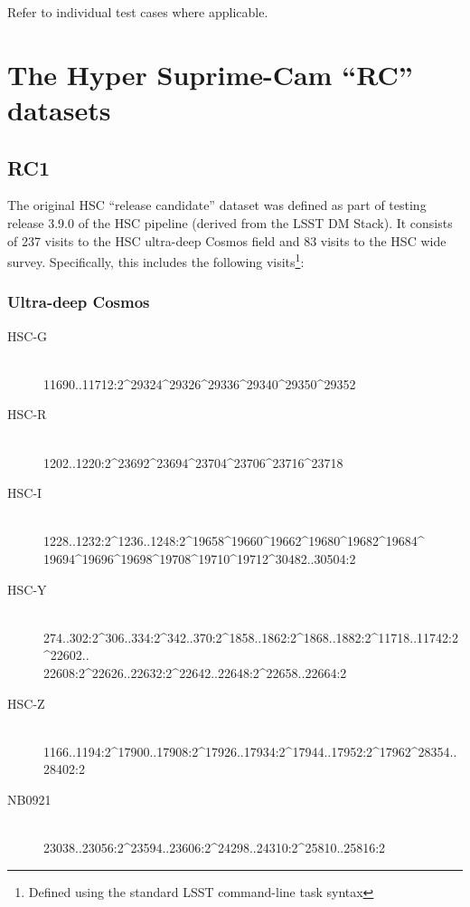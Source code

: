 \documentclass[DM,lsstdraft,STS,toc]{lsstdoc}
\begin{document}
Refer to individual test cases where applicable.





\appendix

\section{The Hyper Suprime-Cam ``RC'' datasets}

\subsection{RC1}

The original HSC ``release candidate'' dataset was defined as part of testing
release 3.9.0 of the HSC pipeline (derived from the LSST DM Stack). It
consists of 237 visits to the HSC ultra-deep Cosmos field and 83 visits to the
HSC wide survey. Specifically, this includes the following
visits\footnote{Defined using the standard LSST command-line task syntax}:

\subsubsection{Ultra-deep Cosmos}
\label{sec:hscrc1}

\begin{description}

\item[HSC-G]{\hfill \\ 11690..11712:2\^{}29324\^{}29326\^{}29336\^{}29340\^{}29350\^{}29352}
\item[HSC-R]{\hfill \\ 1202..1220:2\^{}23692\^{}23694\^{}23704\^{}23706\^{}23716\^{}23718}
\item[HSC-I]{\hfill \\ 1228..1232:2\^{}1236..1248:2\^{}19658\^{}19660\^{}19662\^{}19680\^{}19682\^{}19684\^{}\\19694\^{}19696\^{}19698\^{}19708\^{}19710\^{}19712\^{}30482..30504:2}
\item[HSC-Y]{\hfill \\ 274..302:2\^{}306..334:2\^{}342..370:2\^{}1858..1862:2\^{}1868..1882:2\^{}11718..11742:2\^{}22602..\\22608:2\^{}22626..22632:2\^{}22642..22648:2\^{}22658..22664:2}
\item[HSC-Z]{\hfill \\ 1166..1194:2\^{}17900..17908:2\^{}17926..17934:2\^{}17944..17952:2\^{}17962\^{}28354..28402:2}
\item[NB0921]{\hfill \\ 23038..23056:2\^{}23594..23606:2\^{}24298..24310:2\^{}25810..25816:2}

\end{description}
\end{document}
